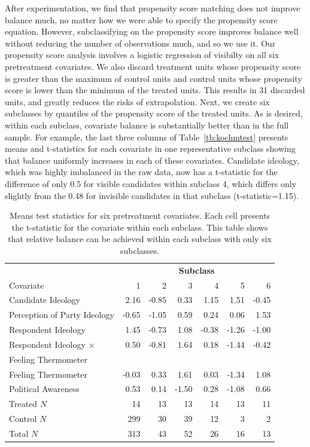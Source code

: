 \documentclass[11pt,titlepage]{article}
\newcommand{\MC}{\multicolumn}
\begin{document}
After experimentation, we find that propensity score matching does not
improve balance much, no matter how we were able to specify the
propensity score equation.  However, subclassifying on the propensity
score improves balance well without reducing the number of
observations much, and so we use it.  Our propensity score analysis
involves a logistic regression of visibilty on all six pretreatment
covariates.  We also discard treatment units whose propensity score is
greater than the maximum of control units and control units whose
propensity score is lower than the minimum of the treated units.  This
results in 31 discarded units, and greatly reduces the risks of
extrapolation.  Next, we create six subclasses by quantiles of the
propensity score of the treated units.  As is desired, within each
subclass, covariate balance is substantially better than in the full
sample.  For example, the last three columns of
Table~\ref{tb:kochmtest} presents means and t-statistics for each
covariate in one representative subclass showing that balance
uniformly increases in each of these covariates.  Candidate ideology,
which was highly imbalanced in the raw data, now has a t-statistic for
the difference of only 0.5 for visible candidates within subclass 4,
which differs only slightly from the 0.48 for invisible candidates in
that subclass (t-statistic=1.15).
\begin{table}[t]
  \begin{center}
    \begin{tabular}{lrrrrrr}
      \hline
      & \MC{6}{c}{\bf Subclass} \\
      Covariate &  1 &  2 &  3 &  4 &  5 &  6 \\
      \hline
      Candidate Ideology & 2.16 & -0.85 & 0.33 & 1.15 & 1.51 & -0.45 \\
      Perception of Party Ideology & -0.65 & -1.05 & 0.59 & 0.24 & 0.06 & 1.53 \\
      Respondent Ideology & 1.45 & -0.73 & 1.08 & -0.38 & -1.26 & -1.00 \\
      Respondent Ideology $\times$ & 0.50 & -0.81 & 1.64 & 0.18 &
      -1.44 & -0.42 \\
      \hspace{0.1in} Feeling Thermometer \\
      Feeling Thermometer & -0.03 & 0.33 & 1.61 & 0.03 & -1.34 & 1.08 \\
      Political Awareness & 0.53 & 0.14 & -1.50 & 0.28 & -1.08 & 0.66
      \\ \hline
      Treated $N$& 14 & 13 & 13 & 14 & 13 & 11 \\
      Control $N$& 299 & 30 & 39 & 12 & 3 & 2 \\
      Total $N$  & 313 & 43 & 52 & 26 & 16 & 13 \\
      \hline
    \end{tabular}
    \caption{Means test statistics for six pretreatment covariates.
      Each cell presents the t-statistic for the covariate within each
      subclass.  This table shows that relative balance can be
      achieved within each subclass with only six subclasses.}
    \label{tb:kochxsub}
  \end{center}
\end{table}
\end{document}
